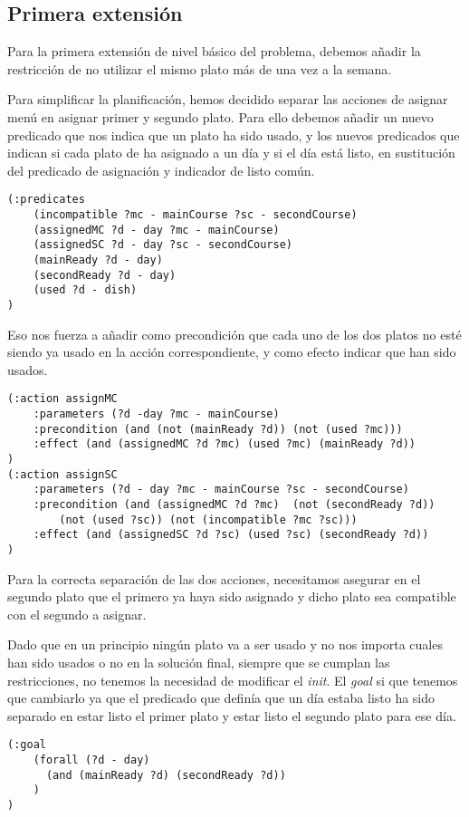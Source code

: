 \documentclass{article}
\begin{document}
\subsection{Primera extensión}
Para la primera extensión de nivel básico del problema, debemos añadir la restricción de no utilizar el mismo plato más de una vez a la semana.
\par
Para simplificar la planificación, hemos decidido separar las acciones de asignar menú en asignar primer y segundo plato. Para ello debemos añadir un nuevo predicado que nos indica que un plato ha sido usado, y los nuevos predicados que indican si cada plato de ha asignado a un día y si el día está listo, en sustitución del predicado de asignación y indicador de listo común.
\begin{lstlisting}[language=pddl]
(:predicates
    (incompatible ?mc - mainCourse ?sc - secondCourse)
    (assignedMC ?d - day ?mc - mainCourse)
    (assignedSC ?d - day ?sc - secondCourse)
    (mainReady ?d - day)
    (secondReady ?d - day)
    (used ?d - dish)
)
\end{lstlisting}
Eso nos fuerza a añadir como precondición que cada uno de los dos platos no esté siendo ya usado en la acción correspondiente, y como efecto indicar que han sido usados.
\begin{lstlisting}[language=pddl]
(:action assignMC
    :parameters (?d -day ?mc - mainCourse)
    :precondition (and (not (mainReady ?d)) (not (used ?mc)))
    :effect (and (assignedMC ?d ?mc) (used ?mc) (mainReady ?d))
)
(:action assignSC
    :parameters (?d - day ?mc - mainCourse ?sc - secondCourse)
    :precondition (and (assignedMC ?d ?mc)  (not (secondReady ?d))
        (not (used ?sc)) (not (incompatible ?mc ?sc)))
    :effect (and (assignedSC ?d ?sc) (used ?sc) (secondReady ?d))
)
\end{lstlisting}
Para la correcta separación de las dos acciones, necesitamos asegurar en el segundo plato que el primero ya haya sido asignado y dicho plato sea compatible con el segundo a asignar.
\par
Dado que en un principio ningún plato va a ser usado y no nos importa cuales han sido usados o no en la solución final, siempre que se cumplan las restricciones, no tenemos la necesidad de modificar el \textit{init}. El \textit{goal} si que tenemos que cambiarlo ya que el predicado que definía que un día estaba listo ha sido separado en estar listo el primer plato y estar listo el segundo plato para ese día.

\begin{lstlisting}[language=pddl]
(:goal
    (forall (?d - day)
      (and (mainReady ?d) (secondReady ?d))
    )
)
\end{lstlisting}
\end{document}
